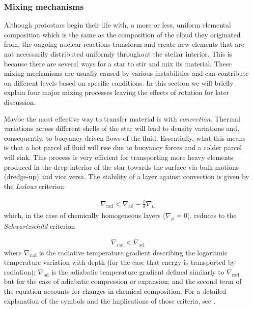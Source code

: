 \documentclass[../../main/thesis_msc.tex]{subfiles}
\begin{document}
				
				
				
				
				
					\subsubsection{Mixing mechanisms}
					
						Although protostars begin their life with, a more or less, uniform elemental composition which is the same as the composition of the cloud they originated from, the ongoing nuclear reactions transform and create new elements that are not necessarily distributed uniformly throughout the stellar interior. This is because there are several ways for a star to stir and mix its material. These mixing mechanisms are usually caused by various instabilities and can contribute on different levels based on specific conditions. In this section we will briefly explain four major mixing processes leaving the effects of rotation for later discussion.
						
						Maybe the most effective way to transfer material is with \emph{convection}. Thermal variations across different shells of the star will lead to density variations and, consequently, to buoyancy driven flows of the fluid. Essentially, what this means is that a hot parcel of fluid will rise due to buoyancy forces and a colder parcel will sink. This process is very efficient for transporting more heavy elements produced in the deep interior of the star towards the surface via bulk motions (dredge-up) and vice versa. The stability of a layer against convection is given by the \emph{Ledoux} criterion
						
						\begin{eqnarray}
							\nabla_{\text{rad}} < \nabla_{\text{ad}} - \frac{\phi}{\delta} \nabla_{\mu}
						\end{eqnarray}
						which, in the case of chemically homogeneous layers ($\nabla_{\mu} = 0$), reduces to the \emph{Schwartzschild} criterion
						
						\begin{eqnarray}
							\nabla_{\text{rad}} < \nabla_{\text{ad}}
						\end{eqnarray}
						where $\nabla_{\text{rad}}$ is the radiative temperature gradient describing the logaritmic temperature variation with depth (for the case that energy is transported by radiation); $\nabla_{\text{ad}}$ is the adiabatic temperature gradient defined similarly to $\nabla_{\text{rad}}$ but for the case of adiabatic compression or expansion; and the second term of the equation accounts for changes in chemical composition. For a detailed explanation of the symbols and the implications of those criteria, see \cite[pp.~49-51]{Kipp_book}.
						
\end{document}
